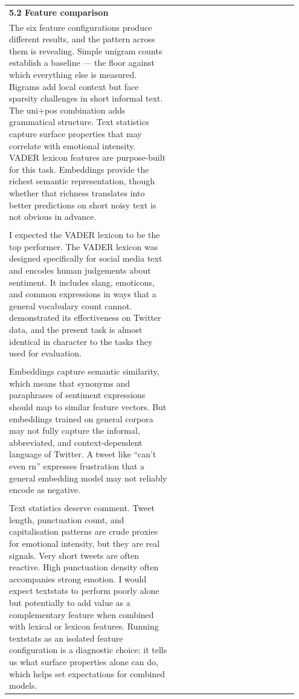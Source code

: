 \documentclass[11pt]{article}
\begin{document}
\begin{longtable}{|p{0.55\linewidth}|p{0.40\linewidth}|}
\hline
\rule{0pt}{3.5cm} & \\
\hline
\multicolumn{2}{|l|}{\textbf{5.2 Feature comparison}} \\[2pt]
\hline
The six feature configurations produce different results, and the pattern across them is revealing. Simple unigram counts establish a baseline --- the floor against which everything else is measured. Bigrams add local context but face sparsity challenges in short informal text. The uni+pos combination adds grammatical structure. Text statistics capture surface properties that may correlate with emotional intensity. VADER lexicon features are purpose-built for this task. Embeddings provide the richest semantic representation, though whether that richness translates into better predictions on short noisy text is not obvious in advance. & \\[2pt]
\hline
\rule{0pt}{3.5cm} & \\
\hline
I expected the VADER lexicon to be the top performer. The VADER lexicon was designed specifically for social media text and encodes human judgements about sentiment. It includes slang, emoticons, and common expressions in ways that a general vocabulary count cannot. demonstrated its effectiveness on Twitter data, and the present task is almost identical in character to the tasks they used for evaluation. & \\[2pt]
\hline
\rule{0pt}{3.5cm} & \\
\hline
Embeddings capture semantic similarity, which means that synonyms and paraphrases of sentiment expressions should map to similar feature vectors. But embeddings trained on general corpora may not fully capture the informal, abbreviated, and context-dependent language of Twitter. A tweet like ``can't even rn'' expresses frustration that a general embedding model may not reliably encode as negative. & \\[2pt]
\hline
\rule{0pt}{3.5cm} & \\
\hline
Text statistics deserve comment. Tweet length, punctuation count, and capitalisation patterns are crude proxies for emotional intensity, but they are real signals. Very short tweets are often reactive. High punctuation density often accompanies strong emotion. I would expect textstats to perform poorly alone but potentially to add value as a complementary feature when combined with lexical or lexicon features. Running textstats as an isolated feature configuration is a diagnostic choice: it tells us what surface properties alone can do, which helps set expectations for combined models. & \\[2pt]

\end{longtable}
\end{document}
